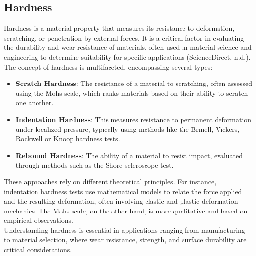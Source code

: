 \documentclass{article}
\begin{document}
   \subsection{Hardness}\label{hardnesstypes}
    Hardness is a material property that measures its resistance to deformation, scratching, or penetration by external forces. It is a critical factor in evaluating the durability and wear resistance of materials, often used in material science and engineering to determine suitability for specific applications (ScienceDirect, n.d.).\\[8pt]
    The concept of hardness is multifaceted, encompassing several types:
    \begin{itemize}
        \item \textbf{Scratch Hardness}: The resistance of a material to scratching, often assessed using the Mohs scale, which ranks materials based on their ability to scratch one another.
        \item \textbf{Indentation Hardness}: This measures resistance to permanent deformation under localized pressure, typically using methods like the Brinell, Vickers, Rockwell or Knoop hardness tests.
        \item \textbf{Rebound Hardness}: The ability of a material to resist impact, evaluated through methods such as the Shore scleroscope test.
    \end{itemize}
    These approaches rely on different theoretical principles. For instance, indentation hardness tests use mathematical models to relate the force applied and the resulting deformation, often involving elastic and plastic deformation mechanics. The Mohs scale, on the other hand, is more qualitative and based on empirical observations.\\[8pt]
    Understanding hardness is essential in applications ranging from manufacturing to material selection, where wear resistance, strength, and surface durability are critical considerations.\\[1.5em]
\end{document}

